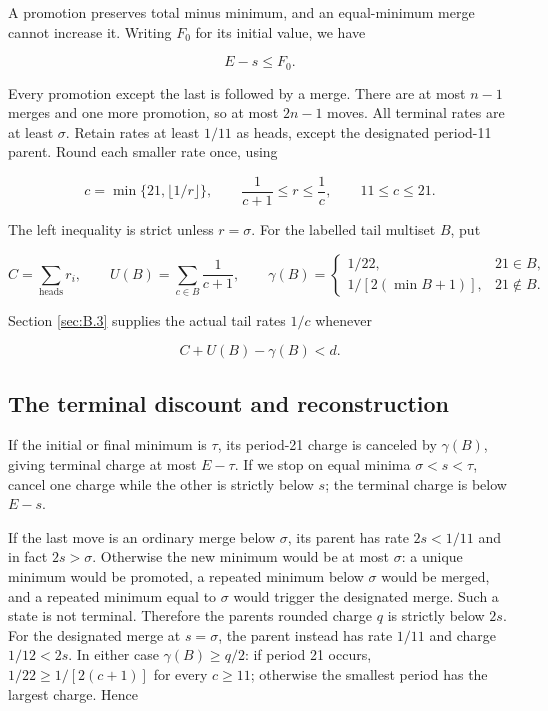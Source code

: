 \documentclass[11pt,a4paper]{article}
\begin{document}
A promotion preserves total minus minimum, and an equal-minimum merge cannot increase it. Writing \(F_0\) for its initial value, we have

\begin{equation}
E-s\le F_0.
\tag{B.1}\label{eq:B.1}
\end{equation}

Every promotion except the last is followed by a merge. There are at most \(n-1\) merges and one more promotion, so at most \(2n-1\) moves. All terminal rates are at least \(\sigma\). Retain rates at least \(1/11\) as heads, except the designated period-11 parent. Round each smaller rate once, using

\begin{equation}
c=\min\{21,\lfloor1/r\rfloor\},\qquad
 \frac1{c+1}\le r\le\frac1c,\qquad 11\le c\le21.
\tag{B.2}\label{eq:B.2}
\end{equation}

The left inequality is strict unless \(r=\sigma\). For the labelled tail multiset \(B\), put

\begin{equation}
C=\sum_{\text{heads}}r_i,\qquad U(B)=\sum_{c\in B}\frac1{c+1},
 \qquad
 \gamma(B)=
 \begin{cases}
  1/22,&21\in B,\\
  1/[2(\min B+1)],&21\notin B.
 \end{cases}
\tag{B.3}\label{eq:B.3}
\end{equation}

Section \ref{sec:B.3} supplies the actual tail rates \(1/c\) whenever

\begin{equation}
C+U(B)-\gamma(B)<d.
\tag{B.4}\label{eq:B.4}
\end{equation}

\subsection{The terminal discount and reconstruction}\label{sec:B.2}

If the initial or final minimum is \(\tau\), its period-21 charge is canceled by \(\gamma(B)\), giving terminal charge at most \(E-\tau\). If we stop on equal minima \(\sigma<s<\tau\), cancel one charge while the other is strictly below \(s\); the terminal charge is below \(E-s\).

If the last move is an ordinary merge below \(\sigma\), its parent has rate \(2s<1/11\) and in fact \(2s>\sigma\). Otherwise the new minimum would be at most \(\sigma\): a unique minimum would be promoted, a repeated minimum below \(\sigma\) would be merged, and a repeated minimum equal to \(\sigma\) would trigger the designated merge. Such a state is not terminal. Therefore the parent\textquotesingle s rounded charge \(q\) is strictly below \(2s\). For the designated merge at \(s=\sigma\), the parent instead has rate \(1/11\) and charge \(1/12<2s\). In either case \(\gamma(B)\ge q/2\): if period 21 occurs, \(1/22\ge1/[2(c+1)]\) for every \(c\ge11\); otherwise the smallest period has the largest charge. Hence
\end{document}
